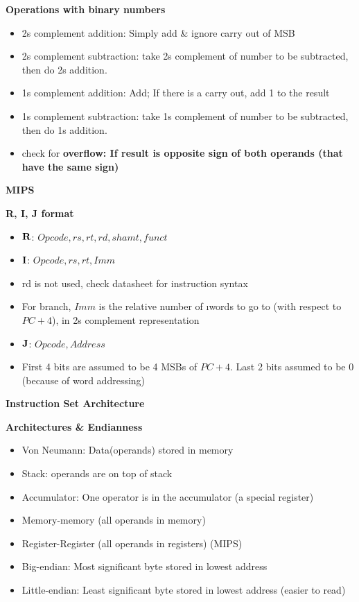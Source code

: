 \documentclass[a4paper]{article} \usepackage[backend=biber, style=numeric, sorting=none]{biblatex}
\begin{document}
\begin{multicols*}{4}
\textbf{Operations with binary numbers}
\begin{itemize}[leftmargin=*]
\itemsep -0.5em
\item 2s complement addition: Simply add \& ignore carry out of MSB
\item 2s complement subtraction: take 2s complement of number to be subtracted, then do 2s addition.
\item 1s complement addition: Add; If there is a carry out, add 1 to the result
\item 1s complement subtraction: take 1s complement of number to be subtracted, then do 1s addition.
\item check for \bf{overflow}: If result is opposite sign of both operands (that have the same sign)
\end{itemize}

{\small\textbf{MIPS}}

\textbf{R, I, J format}
\begin{itemize}[leftmargin=*]
\itemsep -0.5em
\item $\bf{R}$: $Opcode, rs, rt, rd, shamt, funct$
\item $\bf{I}$: $Opcode, rs, rt, Imm$
\item rd is not used, check datasheet for instruction syntax
\item For branch, $Imm$ is the relative number of \i{words} to go to (with respect to $PC + 4$), in 2s complement representation
\item $\bf{J}$: $Opcode, Address$
\item First 4 bits are assumed to be 4 MSBs of $PC + 4$. Last 2 bits assumed to be 0 (because of word addressing)
\end{itemize}

{\small\textbf{Instruction Set Architecture}}

\textbf{Architectures \& Endianness}
\begin{itemize}[leftmargin=*]
\itemsep -0.5em
\item Von Neumann: Data(operands) stored in memory
\item Stack: operands are on top of stack
\item Accumulator: One operator is in the accumulator (a special register)
\item Memory-memory (all operands in memory)
\item Register-Register (all operands in registers) (MIPS)
\item Big-endian: Most significant byte stored in lowest address
\item Little-endian: Least significant byte stored in lowest address (easier to read)
\end{itemize}


\end{multicols*}
\end{document}
